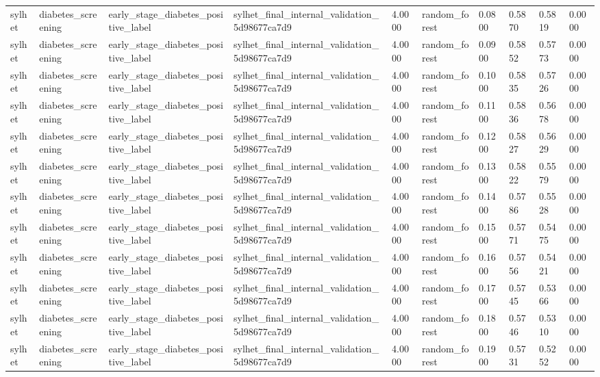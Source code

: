 \begin{tabular}{llllllllll}
sylhet & diabetes\_screening & early\_stage\_diabetes\_positive\_label & sylhet\_final\_internal\_validation\_5d98677ca7d9 & 4.0000 & random\_forest & 0.0800 & 0.5870 & 0.5819 & 0.0000 \\
sylhet & diabetes\_screening & early\_stage\_diabetes\_positive\_label & sylhet\_final\_internal\_validation\_5d98677ca7d9 & 4.0000 & random\_forest & 0.0900 & 0.5852 & 0.5773 & 0.0000 \\
sylhet & diabetes\_screening & early\_stage\_diabetes\_positive\_label & sylhet\_final\_internal\_validation\_5d98677ca7d9 & 4.0000 & random\_forest & 0.1000 & 0.5835 & 0.5726 & 0.0000 \\
sylhet & diabetes\_screening & early\_stage\_diabetes\_positive\_label & sylhet\_final\_internal\_validation\_5d98677ca7d9 & 4.0000 & random\_forest & 0.1100 & 0.5836 & 0.5678 & 0.0000 \\
sylhet & diabetes\_screening & early\_stage\_diabetes\_positive\_label & sylhet\_final\_internal\_validation\_5d98677ca7d9 & 4.0000 & random\_forest & 0.1200 & 0.5827 & 0.5629 & 0.0000 \\
sylhet & diabetes\_screening & early\_stage\_diabetes\_positive\_label & sylhet\_final\_internal\_validation\_5d98677ca7d9 & 4.0000 & random\_forest & 0.1300 & 0.5822 & 0.5579 & 0.0000 \\
sylhet & diabetes\_screening & early\_stage\_diabetes\_positive\_label & sylhet\_final\_internal\_validation\_5d98677ca7d9 & 4.0000 & random\_forest & 0.1400 & 0.5786 & 0.5528 & 0.0000 \\
sylhet & diabetes\_screening & early\_stage\_diabetes\_positive\_label & sylhet\_final\_internal\_validation\_5d98677ca7d9 & 4.0000 & random\_forest & 0.1500 & 0.5771 & 0.5475 & 0.0000 \\
sylhet & diabetes\_screening & early\_stage\_diabetes\_positive\_label & sylhet\_final\_internal\_validation\_5d98677ca7d9 & 4.0000 & random\_forest & 0.1600 & 0.5756 & 0.5421 & 0.0000 \\
sylhet & diabetes\_screening & early\_stage\_diabetes\_positive\_label & sylhet\_final\_internal\_validation\_5d98677ca7d9 & 4.0000 & random\_forest & 0.1700 & 0.5745 & 0.5366 & 0.0000 \\
sylhet & diabetes\_screening & early\_stage\_diabetes\_positive\_label & sylhet\_final\_internal\_validation\_5d98677ca7d9 & 4.0000 & random\_forest & 0.1800 & 0.5746 & 0.5310 & 0.0000 \\
sylhet & diabetes\_screening & early\_stage\_diabetes\_positive\_label & sylhet\_final\_internal\_validation\_5d98677ca7d9 & 4.0000 & random\_forest & 0.1900 & 0.5731 & 0.5252 & 0.0000 \\

\end{tabular}
